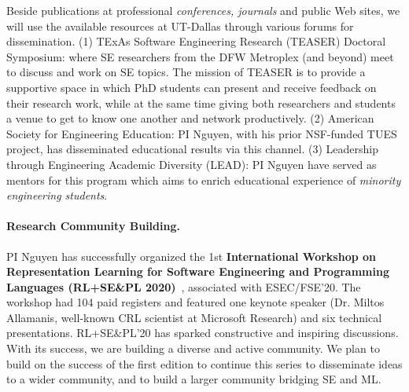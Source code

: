 Beside publications at professional \emph{conferences, journals} and
public Web sites, we will use the available resources at UT-Dallas
through various forums for dissemination.
%
(1) TExAs Software Engineering Research (TEASER) Doctoral Symposium:
where SE researchers from the DFW Metroplex (and beyond) meet to
discuss and work on SE topics.  The mission of TEASER is to provide a
supportive space in which PhD students can present and receive
feedback on their research work, while at the same time giving both
researchers and students a venue to get to know one another and
network productively.  (2) American Society for Engineering Education:
PI Nguyen, with his prior NSF-funded TUES project, has disseminated
educational results via this channel.
(3) Leadership through Engineering Academic Diversity (LEAD): PI
Nguyen have served as mentors for this program which aims to enrich
educational experience of {\em minority engineering students}.

\paragraph{Research Community Building.}

PI Nguyen has successfully organized the 1st {\bf International
Workshop on Representation Learning for Software Engineering and
Programming Languages (RL+SE\&PL 2020)}~\cite{rlsepl}, associated with
ESEC/FSE'20. The workshop had 104 paid registers and featured one
keynote speaker (Dr. Miltos Allamanis, well-known CRL scientist at
Microsoft Research) and six technical presentations. RL+SE\&PL'20 has
sparked constructive and inspiring discussions. With its success, we
are building a diverse and active community. We plan to build on the
success of the first edition to continue this series to disseminate
ideas to a wider community, and to build a larger community bridging
SE and ML.
